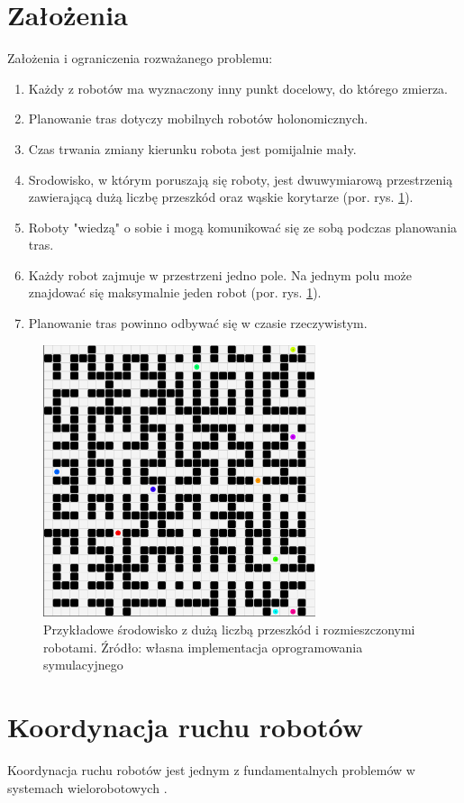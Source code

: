 \section{Założenia}
\label{ch:zalozenia}
Założenia i ograniczenia rozważanego problemu:
\begin{enumerate}
	\item Każdy z robotów ma wyznaczony inny punkt docelowy, do którego zmierza.
	\item Planowanie tras dotyczy mobilnych robotów holonomicznych.
	\item Czas trwania zmiany kierunku robota jest pomijalnie mały.
	\item Srodowisko, w którym poruszają się roboty, jest dwuwymiarową przestrzenią zawierającą dużą liczbę przeszkód oraz wąskie korytarze (por. rys. \ref{fig:img_robopath_sample-maze}).
	\item Roboty "wiedzą" o sobie i mogą komunikować się ze sobą podczas planowania tras.
	\item Każdy robot zajmuje w przestrzeni jedno pole. Na jednym polu może znajdować się maksymalnie jeden robot (por. rys. \ref{fig:img_robopath_sample-maze}).
	\item Planowanie tras powinno odbywać się w czasie rzeczywistym.
\end{enumerate}

\begin{figure}[H]
	\centering
	\includegraphics[width=8cm]{img/robopath/sample-maze}
	\caption{Przykładowe środowisko z dużą liczbą przeszkód i rozmieszczonymi robotami. Źródło: własna implementacja oprogramowania symulacyjnego}
	\label{fig:img_robopath_sample-maze}
\end{figure}


\clearpage
\section{Koordynacja ruchu robotów}
Koordynacja ruchu robotów jest jednym z fundamentalnych problemów w systemach wielorobotowych \cite{optpriorities}.


